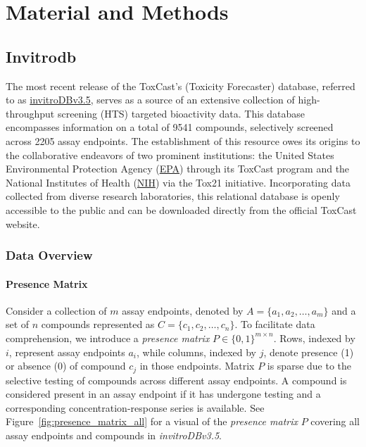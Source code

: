 \chapter{Material and Methods}
\section{Invitrodb}
The most recent release of the ToxCast's (Toxicity Forecaster) database, referred to as \href{https://cfpub.epa.gov/si/si_public_record_Report.cfm?dirEntryId=355484&Lab=CCTE}{invitroDBv3.5}, serves as a source of an extensive collection of high-throughput screening (HTS) targeted bioactivity data. This database encompasses information on a total of 9541 compounds, selectively screened across 2205 assay endpoints. The establishment of this resource owes its origins to the collaborative endeavors of two prominent institutions: the United States Environmental Protection Agency (\href{https://www.epa.gov/chemical-research/exploring-toxcast-data}{EPA}) through its ToxCast program and the National Institutes of Health (\href{https://ntp.niehs.nih.gov/whatwestudy/tox21}{NIH}) via the Tox21 initiative. Incorporating data collected from diverse research laboratories, this relational database is openly accessible to the public and can be downloaded directly from the official ToxCast website.


\subsection{Data Overview}
\subsubsection{Presence Matrix}
Consider a collection of $m$ assay endpoints, denoted by $A = \{a_1, a_2, \dots, a_m\}$ and a set of $n$ compounds represented as $C = \{c_1, c_2, \dots, c_n\}$.
To facilitate data comprehension, we introduce a \emph{presence matrix} $P \in {\{0, 1\}}^{m \times n}$. Rows, indexed by $i$, represent assay endpoints $a_i$, while columns, indexed by $j$, denote presence (1) or absence (0) of compound $c_j$ in those endpoints. Matrix $P$ is sparse due to the selective testing of compounds across different assay endpoints. A compound is considered present in an assay endpoint if it has undergone testing and a corresponding concentration-response series is available.
See Figure~\ref{fig:presence_matrix_all} for a visual of the \emph{presence matrix} $P$ covering all assay endpoints and compounds in \textit{invitroDBv3.5}. 

